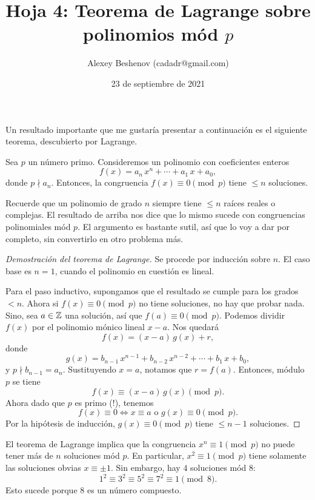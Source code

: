 \documentclass{article}
\title{Hoja 4: Teorema de Lagrange sobre polinomios mód $p$}
\author{Alexey Beshenov (cadadr@gmail.com)}
\date{23 de septiembre de 2021}
\begin{document}
\maketitle

\setcounter{section}{4}

Un resultado importante que me gustaría presentar a continuación es el siguiente
teorema, descubierto por Lagrange.

\begin{framed}
  Sea $p$ un número primo. Consideremos un polinomio con coeficientes enteros
  $$f (x) = a_n\,x^n + \cdots + a_1\,x + a_0,$$
  donde $p \nmid a_n$. Entonces, la congruencia $f (x) \equiv 0 \pmod{p}$ tiene
  $\le n$ soluciones.
\end{framed}

Recuerde que un polinomio de grado $n$ siempre tiene $\le n$ raíces
reales o complejas. El resultado de arriba nos dice que lo mismo sucede con
congruencias polinomiales mód $p$. El argumento es bastante sutil, así que
lo voy a dar por completo, sin convertirlo en otro problema más.

\begin{proof}[Demostración del teorema de Lagrange]
  Se procede por inducción sobre $n$. El caso base es $n = 1$, cuando el
  polinomio en cuestión es lineal.

  Para el paso inductivo, supongamos que el resultado se cumple para los grados
  $< n$. Ahora si $f (x) \equiv 0 \pmod{p}$ no tiene soluciones, no hay que
  probar nada. Sino, sea $a \in \mathbb{Z}$ una solución, así que
  $f (a) \equiv 0 \pmod{p}$. Podemos dividir $f (x)$ por el polinomio mónico
  lineal $x - a$. Nos quedará
  $$f (x) = (x-a)\,g(x) + r,$$
  donde
  $$g (x) = b_{n-1}\,x^{n-1} + b_{n-2}\,x^{n-2} + \cdots + b_1\,x + b_0,$$
  y $p \nmid b_{n-1} = a_n$. Sustituyendo $x = a$, notamos que
  $r = f (a)$. Entonces, módulo $p$ se tiene
  $$f (x) \equiv (x-a)\,g(x) \pmod{p}.$$
  Ahora dado que $p$ es primo (!), tenemos
  \[
    f (x) \equiv 0 \iff
    x \equiv a \text{ o }
    g (x) \equiv 0 \pmod{p}.
  \]
  Por la hipótesis de inducción, $g (x) \equiv 0 \pmod{p}$ tiene $\le n-1$
  soluciones.
\end{proof}

\begin{ejemplo}
  El teorema de Lagrange implica que la congruencia $x^n \equiv 1 \pmod{p}$
  no puede tener más de $n$ soluciones mód $p$. En particular,
  $x^2 \equiv 1 \pmod{p}$ tiene solamente las soluciones obvias
  $x \equiv \pm 1$. Sin embargo, hay $4$ soluciones mód $8$:
  $$1^2 \equiv 3^2 \equiv 5^2 \equiv 7^2 \equiv 1 \pmod{8}.$$
  Esto sucede porque $8$ es un número compuesto.
\end{ejemplo}
\end{document}
